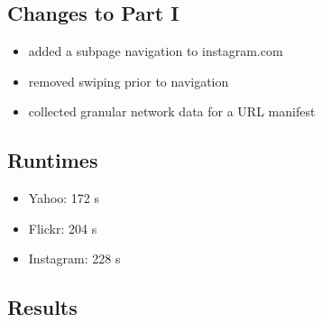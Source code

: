 \documentclass{article}
\begin{document}
\subsection{Changes to Part I}
\begin{itemize}
    \item added a subpage navigation to instagram.com
    \item removed swiping prior to navigation
    \item collected granular network data for a URL manifest
\end{itemize}

\subsection{Runtimes}
\begin{itemize}
    \item Yahoo: 172 s
    \item Flickr: 204 s
    \item Instagram: 228 s
\end{itemize}


\subsection{Results}



\end{document}
